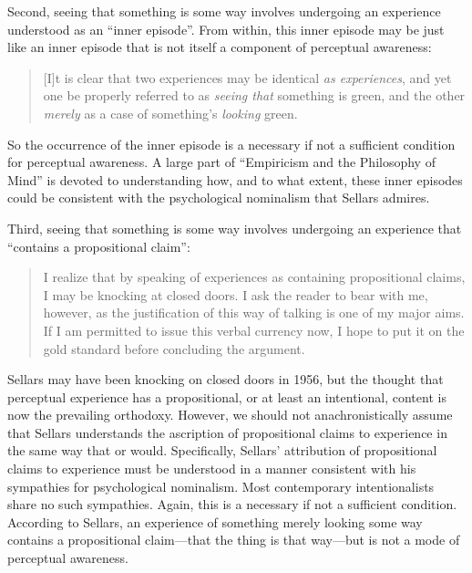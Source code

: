 \documentclass[12pt]{article}
\begin{document}
Second, seeing that something is some way involves undergoing an experience understood as an ``inner episode''. From within, this inner episode may be just like an inner episode that is not itself a component of perceptual awareness:
    \begin{quote}
        [I]t is clear that two experiences may be identical \emph{as experiences}, and yet one be properly referred to as \emph{seeing that} something is green, and the other \emph{merely} as a case of something's \emph{looking} green. \citep[§16]{Sellars:1956xp}
    \end{quote}
    So the occurrence of the inner episode is a necessary if not a sufficient condition for perceptual awareness. A large part of ``Empiricism and the Philosophy of Mind'' is devoted to understanding how, and to what extent, these inner episodes could be consistent with the psychological nominalism that Sellars admires.

Third, seeing that something is some way involves undergoing an experience that ``contains a propositional claim'':
    \begin{quote}
        I realize that by speaking of experiences as containing propositional claims, I may be knocking at closed doors. I ask the reader to bear with me, however, as the justification of this way of talking is one of my major aims. If I am permitted to issue this verbal currency now, I hope to put it on the gold standard before concluding the argument. \citep[§15]{Sellars:1956xp}
    \end{quote}
    Sellars may have been knocking on closed doors in 1956, but the thought that perceptual experience has a propositional, or at least an intentional, content is now the prevailing orthodoxy. However, we should not anachronistically assume that Sellars understands the ascription of propositional claims to experience in the same way that \citet[]{Harman:1990lm} or \citet[]{Tye:2000vn} would. Specifically, Sellars' attribution of propositional claims to experience must be understood in a manner consistent with his sympathies for psychological nominalism. Most contemporary intentionalists share no such sympathies. Again, this is a necessary if not a sufficient condition. According to Sellars, an experience of something merely looking some way contains a propositional claim---that the thing is that way---but is not a mode of perceptual awareness.
\end{document}
